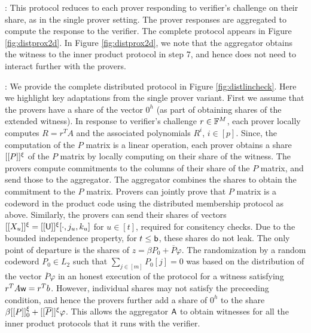 : This protocol reduces to each prover
 responding to verifier's challenge on their share, as in the single
prover setting. The prover responses are aggregated to compute the response to
the verifier. The complete protocol appears in Figure
\ref{fig:distprox2d}. In Figure \ref{fig:distprox2d}, we note that the
aggregator obtains the witness to the inner product protocol in step 7, and
hence does not need to interact further with the provers.

: We provide the complete distributed
protocol in Figure \ref{fig:distlincheck}. Here we highlight key adaptations
from the single prover variant. First we assume that the provers have a share of
the vector $0^h$ (as part of obtaining shares of the extended witness). 
In response to verifier's challenge $r\in
\mathbb{F}^M$, each prover locally computes $R=r^TA$ and the associated polynomials
$R^i$, $i\in [p]$. Since, the computation of the $P$ matrix is a linear
operation, each prover obtains a share $[[{P}]]^\xi$ of the $P$ matrix by locally
computing on their share of the witness. The provers compute commitments to the
columns of their share of the $P$ matrix, and send those to the aggregator. The
aggregator combines the shares to obtain the commitment to the $P$ matrix.
Provers can jointly prove that $P$ matrix is a codeword in the product code
using the distributed membership protocol as above. Similarly, the provers can
send their shares of vectors $[[{X_u}]]^\xi=[[{\mathsf{U}}]]^\xi[\cdot,j_u,k_u]$ for $u\in [t]$, required for consitency
checks. Due to the bounded independence property, for $t\leq \mathsf{b}$, these shares
do not leak. The only point of departure is the shares of $z=\beta P_0 +
\overline{P}\varphi$. The randomization by a random codeword $P_0\in L_2$ such
that $\sum_{j\in [m]} P_0[j]=0$ was based on the distribution of the vector
$\overline{P}\varphi$ in an honest execution of the protocol for a witness
satisfying $r^TA\mathsf{w}=r^Tb$. However, individual shares may not satisfy the
preceeding condition, and hence the provers further add a share of $0^h$ to the share
$\beta[[{P}]]^\xi_0 + [[{\overline{P}}]]^\xi\varphi$. This allows the aggregator $\mathsf{A}$
to obtain witnesses for all the inner product protocols that it runs with the
verifier. 

